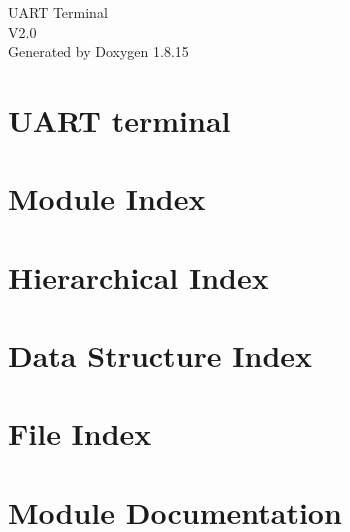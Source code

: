 \let\mypdfximage\pdfximage\def\pdfximage{\immediate\mypdfximage}\documentclass[twoside]{book}
\newcommand{\+}{\discretionary{\mbox{\scriptsize$\hookleftarrow$}}{}{}}
\newcommand{\clearemptydoublepage}{%
  \newpage{\pagestyle{empty}\cleardoublepage}%
}
\begin{document}
\begin{titlepage}
\vspace*{7cm}
\begin{center}%
{\Large U\+A\+RT Terminal \\[1ex]\large V2.\+0 }\\
\vspace*{1cm}
{\large Generated by Doxygen 1.8.15}\\
\end{center}
\end{titlepage}
\clearemptydoublepage
{}
\tableofcontents
\clearemptydoublepage
{}

\chapter{U\+A\+RT terminal}
\label{index}
\chapter{Module Index}

\chapter{Hierarchical Index}

\chapter{Data Structure Index}

\chapter{File Index}

\chapter{Module Documentation}




































\end{document}
